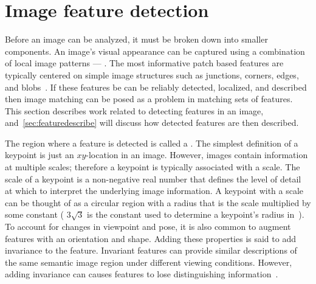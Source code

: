 \section{Image feature detection}\label{sec:featuredetect}

    Before an image can be analyzed, it must be broken down into smaller components. An image's visual appearance
    can be captured using a combination of local image patterns --- . The most
    informative patch based features are typically centered on simple image structures such as junctions, corners,
    edges, and blobs~\cite{tuytelaars_local_2007}. If these features be can be reliably detected, localized, and
    described then image matching can be posed as a problem in matching sets of features. This section describes
    work related to detecting features in an image, and~\cref{sec:featuredescribe} will discuss how detected
    features are then described.

    The region where a feature is detected is called a . The simplest definition of a keypoint
    is just an $xy$-location in an image. However, images contain information at multiple scales; therefore a
    keypoint is typically associated with a scale. The scale of a keypoint is a non-negative real number that
    defines the level of detail at which to interpret the underlying image information. A keypoint with a scale can
    be thought of as a circular region with a radius that is the scale multiplied by some constant (\eg{}
    $3\sqrt{3}$ is the constant used to determine a keypoint's radius in~\cite{perdoch_efficient_2009}). To account
    for changes in viewpoint and pose, it is also common to augment features with an orientation and shape. Adding
    these properties is said to add invariance to the feature. Invariant features can provide similar descriptions
    of the same semantic image region under different viewing conditions. However, adding invariance can causes
    features to lose distinguishing information~\cite{mikolajczyk_comparison_2005, tuytelaars_local_2007,
    perdoch_efficient_2009, lowe_distinctive_2004}.

